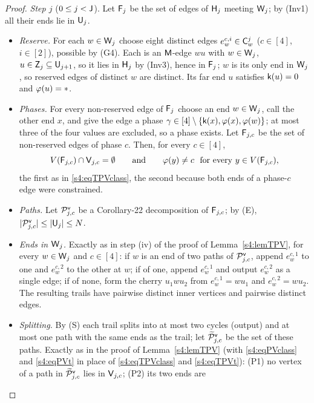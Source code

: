 \begin{proof}
\emph{Step $j$} ($0\le j<\mathsf{J}$). Let $\mathsf{F}_j$ be the set of edges of $\mathsf{H}_j$ meeting $\mathsf{W}_j$; by (Inv1) all their ends lie
in $\mathsf{U}_j$.
\begin{itemize}
\item[(i)] \emph{Reserve.} For each $w\in\mathsf{W}_j$ choose eight distinct edges $e^{c,i}_w\in\mathsf{C}^j_w$ ($c\in[4]$,
  $i\in[2]$), possible by (G4). Each is an $\mathsf{M}$-edge $wu$ with $w\in\mathsf{W}_j$, $u\in\mathsf{Z}_j\subseteq\mathsf{U}_{j+1}$, so it lies
  in $\mathsf{H}_j$ by (Inv3), hence in $\mathsf{F}_j$; $w$ is its only end in $\mathsf{W}_j$, so reserved edges of distinct $w$ are
  distinct. Its far end $u$ satisfies $\mathsf{k}(u)=0$ and $\varphi(u)=*$.
\item[(ii)] \emph{Phases.} For every non-reserved edge of $\mathsf{F}_j$ choose an end $w\in\mathsf{W}_j$, call the other end $x$,
  and give the edge a phase $\gamma\in[4]\setminus\{\mathsf{k}(x),\varphi(x),\varphi(w)\}$; at most three of the four values
  are excluded, so a phase exists. Let $\mathsf{F}_{j,c}$ be the set of non-reserved edges of phase $c$. Then, for every
  $c\in[4]$,
  \begin{equation}\label{s4:eqPVclass}
  V(\mathsf{F}_{j,c})\cap\mathsf{V}_{j,c}=\emptyset\qquad\text{and}\qquad \varphi(y)\ne c\ \text{ for every } y\in V(\mathsf{F}_{j,c}),
  \end{equation}
  the first as in \eqref{s4:eqTPVclass}, the second because both ends of a phase-$c$ edge were constrained.
\item[(iii)] \emph{Paths.} Let $\mathcal{P}^{\mathsf{v}}_{j,c}$ be a Corollary-22 decomposition of $\mathsf{F}_{j,c}$; by \textup{(E)},
  $|\mathcal{P}^{\mathsf{v}}_{j,c}|\le|\mathsf{U}_j|\le N$.
\item[(iv)] \emph{Ends in $\mathsf{W}_j$.} Exactly as in step (iv) of the proof of Lemma~\ref{s4:lemTPV}, for every
  $w\in\mathsf{W}_j$ and $c\in[4]$: if $w$ is an end of two paths of $\mathcal{P}^{\mathsf{v}}_{j,c}$, append $e^{c,1}_w$ to one and
  $e^{c,2}_w$ to the other at $w$; if of one, append $e^{c,1}_w$ and output $e^{c,2}_w$ as a single edge; if of none,
  form the cherry $u_1wu_2$ from $e^{c,1}_w=wu_1$ and $e^{c,2}_w=wu_2$. The resulting trails have pairwise distinct
  inner vertices and pairwise distinct edges.
\item[(v)] \emph{Splitting.} By \textup{(S)} each trail splits into at most two cycles (output) and at most one path
  with the same ends as the trail; let $\widetilde{\mathcal{P}}^{\mathsf{v}}_{j,c}$ be the set of these paths. Exactly as in the proof of
  Lemma~\ref{s4:lemTPV} (with \eqref{s4:eqPVclass} and \eqref{s4:eqPVt} in place of \eqref{s4:eqTPVclass} and
  \eqref{s4:eqTPVt}): (P1) no vertex of a path in $\widetilde{\mathcal{P}}^{\mathsf{v}}_{j,c}$ lies in $\mathsf{V}_{j,c}$; (P2) its two ends are

\end{itemize}
\end{proof}
